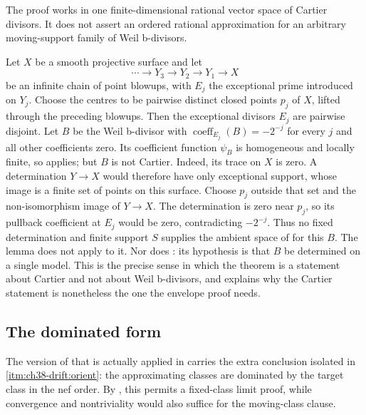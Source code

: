 \begin{remark}
\label{rem:ch38-fixed-support}
The proof works in one finite-dimensional rational vector space of Cartier
divisors.  It does not assert an ordered rational approximation for an
arbitrary moving-support family of Weil b-divisors.
\end{remark}

\begin{example}
\label{ex:ch38-moving-support}
Let $X$ be a smooth projective surface and let
\[
 \cdots\longrightarrow Y_3\longrightarrow Y_2\longrightarrow Y_1
 \longrightarrow X
\]
be an infinite chain of point blowups, with $E_j$ the exceptional prime
introduced on $Y_j$. Choose the centres to be pairwise distinct
closed points $p_j$ of $X$, lifted through the preceding blowups.
Then the exceptional divisors $E_j$ are pairwise disjoint. Let
$B$ be the Weil b-divisor with $\operatorname{coeff}_{E_j}(B)=-2^{-j}$
for every $j$ and all other coefficients zero.  Its coefficient function
$\psi_B$ is homogeneous and locally finite, so
 applies; but $B$ is not
Cartier. Indeed, its trace on $X$ is zero. A determination
$Y\to X$ would therefore have only exceptional support, whose image
is a finite set of points on this surface. Choose $p_j$ outside
that set and the non-isomorphism image of $Y\to X$.
The determination is zero near $p_j$, so its pullback coefficient
at $E_j$ would be zero, contradicting $-2^{-j}$.
Thus no fixed determination and finite support $S$ supplies the
ambient space of 
for this $B$. The lemma does not apply to it.  Nor does
: its hypothesis is that $B$ be
determined on a single model.  This is the precise sense in which the
theorem is a statement about Cartier and not about Weil b-divisors, and
 explains why the Cartier statement is
nonetheless the one the envelope proof needs.
\end{example}

\subsection{The dominated form}
\label{sec:ch38-approximation-dominated}

The version of  that is
actually applied in  carries the extra
conclusion isolated in
\,\cref{itm:ch38-drift:orient}: the
approximating classes are dominated by the target class in the nef order.
By , this permits a fixed-class
limit proof, while convergence and nontriviality would also suffice
for the moving-class clause.

